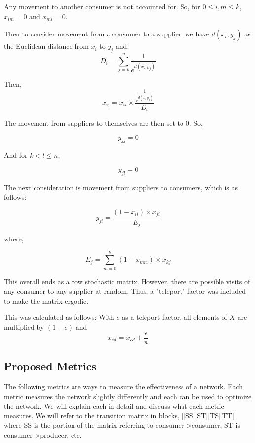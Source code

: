 \documentclass[twoside,twocolumn]{article}
\begin{document}
Any movement to another consumer is not accounted for.
So, for $0 \leq i,m \leq k$, $x_{im} = 0$ and $x_{mi} = 0$.

Then to consider movement from a consumer to a supplier, we have $d(x_i, y_j)$ as the Euclidean distance from $x_i$ to $y_j$ and:
$$D_i = \sum_{j=k}^{n} \frac{1}{e^{d(x_i,y_j)}}$$

Then,
$$x_{ij} = x_{ii} \times \frac{\frac{1}{e^{d(x_i,y_j)}}}{D_i}$$ 

The movement from suppliers to themselves are then set to 0.
So,

$$y_{jj} = 0$$

And for $k < l \leq n$,

$$y_{jl} = 0$$

The next consideration is movement from suppliers to consumers, which is as follows:

$$y_{ji} = \frac{(1-x_{ii})\times x_{ji}}{E_j}$$

where, 

$$E_j = \sum_{m=0}^{k} (1-x_{mm})\times x_{kj}$$

This overall ends as a row stochastic matrix.
However, there are possible visits of any consumer to any supplier at random.
Thus, a "teleport" factor was included to make the matrix ergodic.

This was calculated as follows:
With $e$ as a teleport factor, all elements of $X$ are multiplied by $(1-e)$ and 
$$x_{cd} = x_{cd} + \frac{e}{n}$$









\subsection{Proposed Metrics}
The following metrics are ways to measure the effectiveness of a network.
Each metric measures the network slightly differently and each can be used to optimize the network.
We will explain each in detail and discuss what each metric measures.
We will refer to the transition matrix in blocks, [[SS][ST][TS][TT]] where SS is the portion of the matrix referring to consumer->consumer, ST is consumer->producer, etc.
\end{document}
